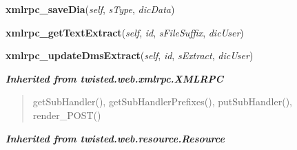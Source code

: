     \vspace{0.5ex}

\hspace{.8\funcindent}\begin{boxedminipage}{\funcwidth}

    \raggedright \textbf{xmlrpc\_saveDia}(\textit{self}, \textit{sType}, \textit{dicData})

\setlength{\parskip}{2ex}
\setlength{\parskip}{1ex}
    \end{boxedminipage}

    \label{cuon:Misc:Misc:xmlrpc_getTextExtract}

    \vspace{0.5ex}

\hspace{.8\funcindent}\begin{boxedminipage}{\funcwidth}

    \raggedright \textbf{xmlrpc\_getTextExtract}(\textit{self}, \textit{id}, \textit{sFileSuffix}, \textit{dicUser})

\setlength{\parskip}{2ex}
\setlength{\parskip}{1ex}
    \end{boxedminipage}

    \label{cuon:Misc:Misc:xmlrpc_updateDmsExtract}

    \vspace{0.5ex}

\hspace{.8\funcindent}\begin{boxedminipage}{\funcwidth}

    \raggedright \textbf{xmlrpc\_updateDmsExtract}(\textit{self}, \textit{id}, \textit{sExtract}, \textit{dicUser})

\setlength{\parskip}{2ex}
\setlength{\parskip}{1ex}
    \end{boxedminipage}


\large{\textbf{\textit{Inherited from twisted.web.xmlrpc.XMLRPC}}}

\begin{quote}
getSubHandler(), getSubHandlerPrefixes(), putSubHandler(), render\_POST()
\end{quote}

\large{\textbf{\textit{Inherited from twisted.web.resource.Resource}}}

